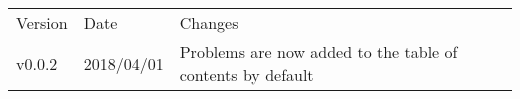 \begin{tabular}{lll}
  Version&Date&Changes\\
  v0.0.2&2018/04/01&Problems are now added to the table of contents by default
\end{tabular}
